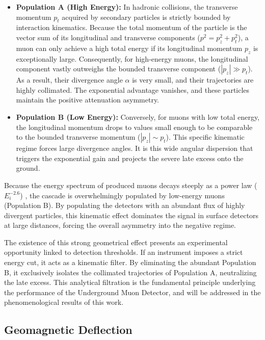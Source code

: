 \documentclass[11pt,a4paper]{article}
\begin{document}
\begin{itemize}
    \item \textbf{Population A (High Energy):} In hadronic collisions, the transverse momentum $p_t$ acquired by secondary particles is strictly bounded by interaction kinematics. Because the total momentum of the particle is the vector sum of its longitudinal and transverse components ($p^2 = p_z^2 + p_t^2$), a muon can only achieve a high total energy if its longitudinal momentum $p_z$ is exceptionally large. Consequently, for high-energy muons, the longitudinal component vastly outweighs the bounded transverse component ($|p_z| \gg p_t$). As a result, their divergence angle $\alpha$ is very small, and their trajectories are highly collimated. The exponential advantage vanishes, and these particles maintain the positive attenuation asymmetry.
    
    \item \textbf{Population B (Low Energy):} Conversely, for muons with low total energy, the longitudinal momentum drops to values small enough to be comparable to the bounded transverse momentum ($|p_z| \sim p_t$). This specific kinematic regime forces large divergence angles. It is this wide angular dispersion that triggers the exponential gain and projects the severe late excess onto the ground.
\end{itemize}

Because the energy spectrum of produced muons decays steeply as a power law ($E_i^{-2.6}$) \cite{Cazon2012}, the cascade is overwhelmingly populated by low-energy muons (Population B). By populating the detectors with an abundant flux of highly divergent particles, this kinematic effect dominates the signal in surface detectors at large distances, forcing the overall asymmetry into the negative regime. 

The existence of this strong geometrical effect presents an experimental opportunity linked to detection thresholds. If an instrument imposes a strict energy cut, it acts as a kinematic filter. By eliminating the abundant Population B, it exclusively isolates the collimated trajectories of Population A, neutralizing the late excess. This analytical filtration is the fundamental principle underlying the performance of the Underground Muon Detector, and will be addressed in the phenomenological results of this work.

\subsection{Geomagnetic Deflection}
\label{subsec:geomagnetic}
\end{document}
